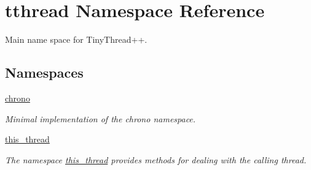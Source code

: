 \hypertarget{namespacetthread}{}\section{tthread Namespace Reference}
\label{namespacetthread}


Main name space for Tiny\+Thread++.  


\subsection*{Namespaces}
\begin{DoxyCompactItemize}
\item 
 \hyperlink{namespacetthread_1_1chrono}{chrono}
\begin{DoxyCompactList}\small\item\em Minimal implementation of the {\ttfamily chrono} namespace. \end{DoxyCompactList}\item 
 \hyperlink{namespacetthread_1_1this__thread}{this\+\_\+thread}
\begin{DoxyCompactList}\small\item\em The namespace {\ttfamily \hyperlink{namespacetthread_1_1this__thread}{this\+\_\+thread}} provides methods for dealing with the calling thread. \end{DoxyCompactList}\end{DoxyCompactItemize}
